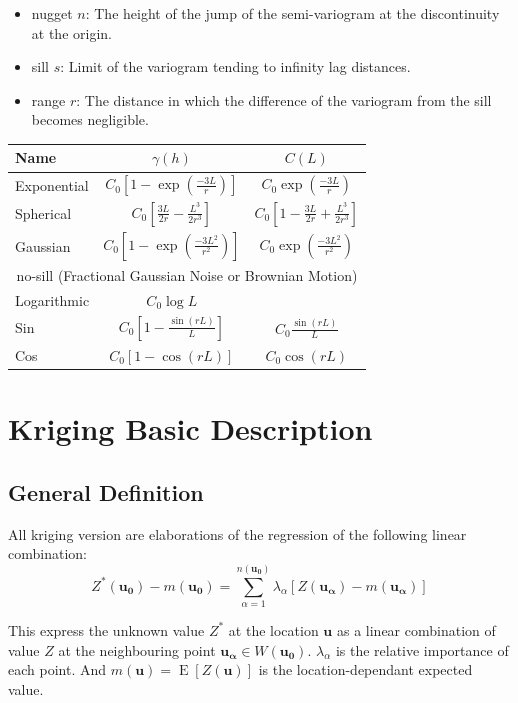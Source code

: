 \documentclass[twocolumn]{article}
\numberwithin{equation}{section}
\begin{document}
\begin{itemize}
	\item nugget $n$: The height of the jump of the semi-variogram at the discontinuity at the origin.
	\item sill $s$: Limit of the variogram tending to infinity lag distances.
	\item range $r$: The distance in which the difference of the variogram from the sill becomes negligible.
\end{itemize}

\begin{tabular}{lcc}
Name			& $\gamma(h)$  & $C(L)$  \\
\hline
Exponential 	& $C_0 \left[1-\exp\left(\frac{-3L}{r}\right)\right]$ 	& $C_0 \exp\left(\frac{-3L}{r}\right)$\\
Spherical		& $C_0 \left[\frac{3L}{2r}-\frac{L^3}{2r^3}\right]$		& $C_0 \left[1-\frac{3L}{2r}+\frac{L^3}{2r^3}\right]$ \\
Gaussian 		& $C_0 \left[1-\exp\left(\frac{-3L^2}{r^2}\right)\right]$& $C_0 \exp\left(\frac{-3L^2}{r^2}\right)$\\ 
\multicolumn{3}{c}{no-sill (Fractional Gaussian Noise or Brownian Motion)}\\
Logarithmic 	& $C_0 \log L$&\\
Sin		 		& $C_0\left[1-\frac{\sin(rL)}{L}\right]$ 				& $C_0\frac{\sin(rL)}{L}$\\
Cos		 		& $C_0\left[1-\cos(rL)\right]$ 							& $C_0\cos(rL)$\\
\end{tabular}


\section{Kriging Basic Description}

\subsection{General Definition}
All kriging version are elaborations of the regression of the following linear combination:
\begin{equation} \label{eq:krig1}
	Z^* (\boldsymbol{u_0}) -m(\boldsymbol{u_0}) =  \sum_{\alpha=1}^{n(\boldsymbol{u_0})} \lambda_\alpha \left[  Z(\boldsymbol{u_\alpha}) - m(\boldsymbol{u_\alpha})\right]
\end{equation}
	
This express the unknown value $Z^*$ at the location $\boldsymbol{u}$ as a linear combination of value $Z$ at the neighbouring point $\boldsymbol{u_\alpha} \in W(\boldsymbol{u_0})$. $\lambda_\alpha$ is the relative importance of each point. And $m(\boldsymbol{u}) =\operatorname{E}[Z(\boldsymbol{u})]$ is the location-dependant expected value.
\end{document}
